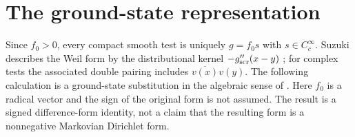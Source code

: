 \section{The ground-state representation}\label{sec:gs}

Since $f_0>0$, every compact smooth test is uniquely $g=f_0s$ with
$s\in C_c^\infty$. Suzuki describes the Weil form by the
distributional kernel $-g_{\rm scr}''(x-y)$
\cite[\S3.5]{Suzuki2023Screw}\cite[\S2.5]{Suzuki2026}; for complex
tests the associated double pairing includes
$\overline{v(x)}v(y)$. The following calculation is a ground-state
substitution in the algebraic sense of
\cite{FrankSeiringer2008}. Here $f_0$ is a radical vector and the
sign of the original form is not assumed. The result is a signed
difference-form identity, not a claim that the resulting form is a
nonnegative Markovian Dirichlet form.

